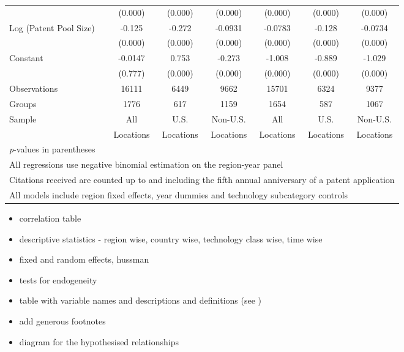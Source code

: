 \documentclass[12pt,letterpaper]{article}
\begin{document}
\begin{table}[htbp]
\begin{tabular}{l*{6}{c}}
                &  (0.000)&  (0.000)&  (0.000)&  (0.000)&  (0.000)&  (0.000)\\
Log (Patent Pool Size)&   -0.125&   -0.272&  -0.0931&  -0.0783&   -0.128&  -0.0734\\
                &  (0.000)&  (0.000)&  (0.000)&  (0.000)&  (0.000)&  (0.000)\\
Constant        &  -0.0147&    0.753&   -0.273&   -1.008&   -0.889&   -1.029\\
                &  (0.777)&  (0.000)&  (0.000)&  (0.000)&  (0.000)&  (0.000)\\
\hline
Observations    &    16111&     6449&     9662&    15701&     6324&     9377\\
Groups          &     1776&      617&     1159&     1654&      587&     1067\\
Sample&All &U.S. &Non-U.S.&All &U.S. &Non-U.S. \\
          &Locations &Locations&Locations&Locations &Locations&Locations \\
\hline\hline
\multicolumn{7}{l}{\footnotesize \textit{p}-values in parentheses}\\
\multicolumn{7}{l}{\footnotesize All regressions use negative binomial estimation on the region-year panel}\\
\multicolumn{7}{l}{\footnotesize Citations received are counted up to and including the fifth annual anniversary of a patent application}\\
\multicolumn{7}{l}{\footnotesize All models include region fixed effects, year dummies and technology subcategory controls}\\
\end{tabular}
\end{table}


\normalsize
\doublespacing

\begin{itemize}
\item correlation table
\item descriptive statistics - region wise, country wise, technology class wise, time wise
\item fixed and random effects, hussman
\item tests for endogeneity
\item table with variable names and descriptions and definitions (see \cite{Funk2014})
\item add generous footnotes
\item diagram for the hypothesised relationships
\end{itemize}
\end{document}
